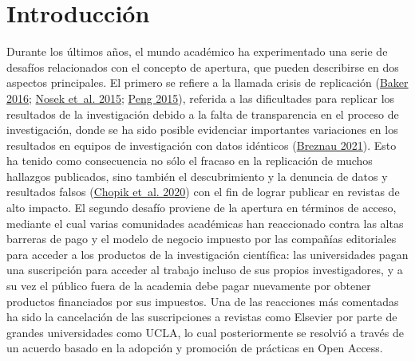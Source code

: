\documentclass[
  letterpaper,
  DIV=11,
  numbers=noendperiod]{scrreprt}
\begin{document}
\ifdefined\Shaded\renewenvironment{Shaded}{\begin{tcolorbox}[interior hidden, borderline west={3pt}{0pt}{shadecolor}, frame hidden, boxrule=0pt, sharp corners, enhanced, breakable]}{\end{tcolorbox}}\fi

\hypertarget{introducciuxf3n}{%
\chapter{Introducción}\label{introducciuxf3n}}

Durante los últimos años, el mundo académico ha experimentado una serie
de desafíos relacionados con el concepto de apertura, que pueden
describirse en dos aspectos principales. El primero se refiere a la
llamada crisis de replicación
(\protect\hyperlink{ref-baker_500_2016}{Baker 2016};
\protect\hyperlink{ref-nosek_promoting_2015}{Nosek et~al. 2015};
\protect\hyperlink{ref-peng_reproducibility_2015}{Peng 2015}), referida
a las dificultades para replicar los resultados de la investigación
debido a la falta de transparencia en el proceso de investigación, donde
se ha sido posible evidenciar importantes variaciones en los resultados
en equipos de investigación con datos idénticos
(\protect\hyperlink{ref-breznau_does_2021}{Breznau 2021}). Esto ha
tenido como consecuencia no sólo el fracaso en la replicación de muchos
hallazgos publicados, sino también el descubrimiento y la denuncia de
datos y resultados falsos
(\protect\hyperlink{ref-chopik_relationship_2020}{Chopik et~al. 2020})
con el fin de lograr publicar en revistas de alto impacto. El segundo
desafío proviene de la apertura en términos de acceso, mediante el cual
varias comunidades académicas han reaccionado contra las altas barreras
de pago y el modelo de negocio impuesto por las compañías editoriales
para acceder a los productos de la investigación científica: las
universidades pagan una suscripción para acceder al trabajo incluso de
sus propios investigadores, y a su vez el público fuera de la academia
debe pagar nuevamente por obtener productos financiados por sus
impuestos. Una de las reacciones más comentadas ha sido la cancelación
de las suscripciones a revistas como Elsevier por parte de grandes
universidades como UCLA, lo cual posteriormente se resolvió a través de
un acuerdo basado en la adopción y promoción de prácticas en Open
Access.
\end{document}
